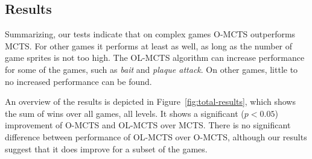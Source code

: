 \subsection{Results}
\label{subsec:totals}
Summarizing, our tests indicate that on complex games O-MCTS outperforms MCTS\@.
For other games it performs at least as well, as long as the number of game
sprites is not too high.  The OL-MCTS algorithm can increase performance for
some of the games, such as \textit{bait} and \textit{plaque attack}. On other
games, little to no increased performance can be found.

An overview of the results is depicted in Figure~\ref{fig:total-results}, which
shows the sum of wins over all games, all levels.  It shows a significant ($p <
0.05$) improvement of O-MCTS and OL-MCTS over MCTS\@.  There is no significant
difference between performance of OL-MCTS over O-MCTS, although our results
suggest that it does improve for a subset of the games.
